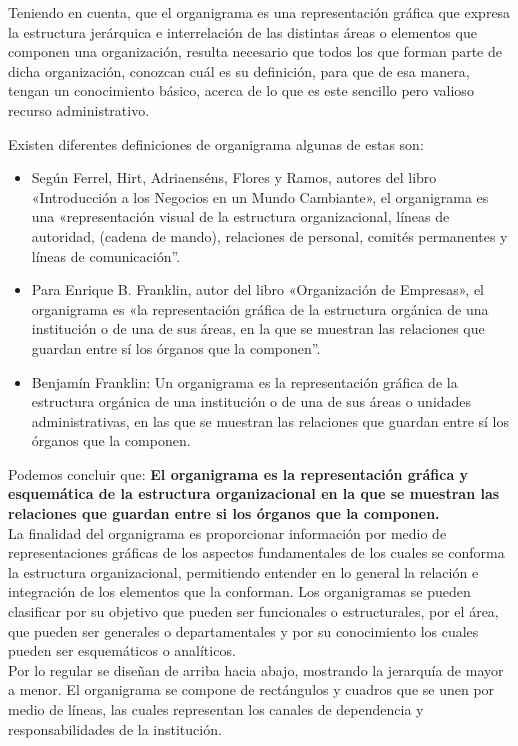 \documentclass[letterpaper,12pt]{article}
\begin{document}
\begin{sloppypar}
Teniendo en cuenta, que el organigrama es una representación gráfica que expresa la estructura  jerárquica e interrelación de las distintas áreas o elementos que componen una organización, resulta necesario que todos los que forman parte de dicha organización, conozcan cuál es su definición, para que de esa manera, tengan un conocimiento básico, acerca de lo que es este sencillo pero valioso recurso administrativo.

Existen diferentes definiciones de organigrama algunas de estas son:
\begin{itemize}
    \item Según Ferrel, Hirt, Adriaenséns, Flores y Ramos, autores del libro «Introducción a los Negocios en un Mundo Cambiante», el organigrama es una «representación visual de la estructura organizacional, líneas de autoridad, (cadena de mando), relaciones de personal, comités permanentes y líneas de comunicación”.
    \item Para Enrique B. Franklin, autor del libro «Organización de Empresas», el organigrama es  «la representación gráfica de la estructura orgánica de una institución o de una de sus áreas, en la que se muestran las relaciones que guardan entre sí los órganos que la componen”.
    \item Benjamín Franklin: Un organigrama es la representación gráfica de la estructura orgánica de una institución o de una de sus áreas o unidades administrativas, en las que se muestran las relaciones que guardan entre sí los órganos que la componen.
\end{itemize}

Podemos concluir que: \textbf{El organigrama es la representación gráfica y esquemática de la estructura organizacional en la que se muestran las relaciones que guardan entre si los órganos que la componen.}
\vspace{0.3cm}\\
La finalidad del organigrama es proporcionar información por medio de representaciones gráficas de los aspectos fundamentales de los cuales se conforma la estructura organizacional, permitiendo entender en lo general la relación e integración de los elementos que la conforman. Los organigramas se pueden clasificar por su objetivo que pueden ser funcionales o estructurales, por el área, que pueden ser generales o departamentales y por su conocimiento los cuales pueden ser esquemáticos o analíticos.
\vspace{0.3cm}\\
Por lo regular se diseñan de arriba hacia abajo, mostrando la jerarquía de mayor a menor. El organigrama se compone de rectángulos y cuadros que se unen por medio de líneas, las cuales representan los canales de dependencia y responsabilidades de la institución.


\end{sloppypar}
\end{document}
